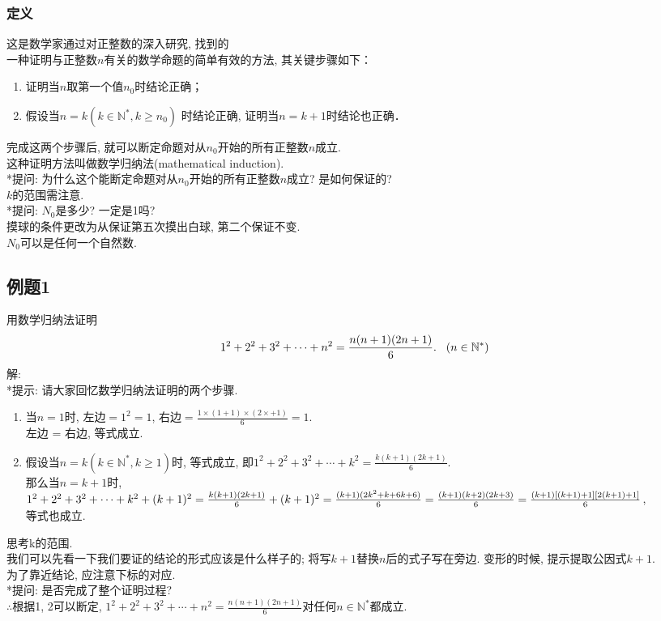 \documentclass{article}
\begin{document}
\begin{CJK}{UTF8}{gkai}
\subsubsection{定义}
这是数学家通过对正整数的深入研究, 找到的\\
一种证明与正整数$n$有关的数学命题的简单有效的方法, 其关键步骤如下：
\begin{enumerate}[i]
\item 证明当$n$取第一个值$n_0$时结论正确；
\item 假设当$n = k (k \in \mathbb{N}^*, k \geq n_0)$ 时结论正确, 证明当$n = k + 1$时结论也正确．
\end{enumerate}
完成这两个步骤后, 就可以断定命题对从$n_0$开始的所有正整数$n$成立.\\这种证明方法叫做数学归纳法(mathematical induction).\\
*提问: 为什么这个能断定命题对从$n_0$开始的所有正整数$n$成立? 是如何保证的?\\
$k$的范围需注意.\\
*提问: $N_0$是多少? 一定是1吗?\\
摸球的条件更改为从保证第五次摸出白球, 第二个保证不变.\\
$N_0$可以是任何一个自然数.\\


\subsection{例题1}
用数学归纳法证明
$$1^2 + 2^2 + 3^2 + \cdots + n^2 = \frac{n(n + 1)(2n + 1)}{6}.\hspace{3mm}(n \in \mathbb{N}^*)$$
解: \\
*提示: 请大家回忆数学归纳法证明的两个步骤.\\
\begin{enumerate}[i]
\item 当$n = 1$时, 左边$= 1^2 = 1$, 右边$= \frac{1 \times (1 + 1) \times (2 \times + 1)}{6} = 1$.\\左边 = 右边, 等式成立.
\item 假设当$n = k (k \in \mathbb{N}^*, k \geq 1)$时, 等式成立, 即$1^2 + 2^2 + 3^2 + \cdots + k^2 = \frac{k(k + 1)(2k + 1)}{6}.$
\\那么当$n = k + 1$时, \\$1^2 + 2^2 + 3^2 + \cdots + k^2 + (k + 1)^2\\= \frac{k(k + 1)(2k + 1)}{6} + (k+1)^2\\= \frac{(k + 1)(2k^2 + k + 6k +6)}{6}\\= \frac{(k + 1)(k + 2)(2k + 3)}{6}\\= \frac{(k + 1)[(k + 1) + 1][2(k + 1) + 1]}{6}$, \\等式也成立.
\end{enumerate}
思考k的范围.\\
我们可以先看一下我们要证的结论的形式应该是什么样子的; 将写$k + 1$替换$n$后的式子写在旁边. 变形的时候, 提示提取公因式$k + 1$.\\
为了靠近结论, 应注意下标的对应.\\
*提问: 是否完成了整个证明过程?\\
$\therefore$根据1, 2可以断定, $1^2 + 2^2 + 3^2 + \cdots + n^2 = \frac{n(n + 1)(2n + 1)}{6}$对任何$n \in \mathbb{N}^*$都成立.


\end{CJK}
\end{document}
